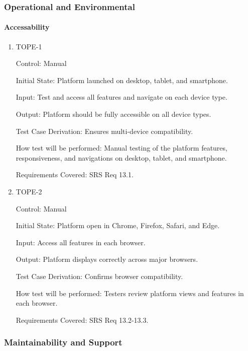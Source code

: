 \documentclass[12pt, titlepage]{article}
\begin{document}
\subsubsection{Operational and Environmental}

\paragraph{Accessability}

\begin{enumerate}

    \item{TOPE-1\\}

          Control: Manual

          Initial State: Platform launched on desktop, tablet, and smartphone.

          Input: Test and access all features and navigate on each device type.

          Output: Platform should be fully accessible on all device types.

          Test Case Derivation: Ensures multi-device compatibility.

          How test will be performed: Manual testing of the platform features, responsiveness, and navigations on desktop, tablet, and smartphone.

          Requirements Covered: SRS Req 13.1.

    \item{TOPE-2\\}

          Control: Manual

          Initial State: Platform open in Chrome, Firefox, Safari, and Edge.

          Input: Access all features in each browser.

          Output: Platform displays correctly across major browsers.

          Test Case Derivation: Confirms browser compatibility.

          How test will be performed: Testers review platform views and features in each browser.

          Requirements Covered: SRS Req 13.2-13.3.

\end{enumerate}

\subsubsection{Maintainability and Support}
\end{document}
